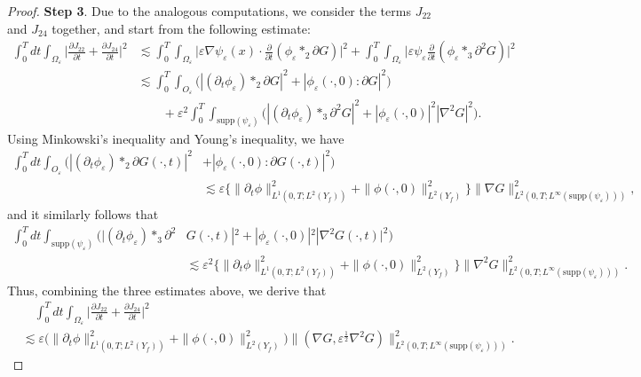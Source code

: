 \documentclass[13pt,CJK]{article}
\theoremstyle{plain}                       %
\theoremstyle{remark}
\numberwithin{equation}{section}
\begin{document}
\begin{proof}
\textbf{Step 3}.
Due to the analogous computations, we consider the terms $J_{22}$ and $J_{24}$ together, and start from
the following estimate:
\begin{equation*}
  \begin{aligned}
  \int_{0}^{T}dt\int_{\Omega_{\varepsilon}}
  \bigg|\frac{\partial J_{22}}{\partial t}+\frac{\partial J_{24}}{\partial t}\bigg|^2
  &\lesssim
  \int_{0}^{T}\int_{\Omega_{\varepsilon}}
  \bigg|\varepsilon\nabla\psi_{\varepsilon}(x)\cdot
  \frac{\partial}{\partial t}(\phi_{\varepsilon}\ast_2\partial G)\bigg|^2 +
  \int_{0}^{T}\int_{\Omega_{\varepsilon}}
 \bigg|\varepsilon\psi_{\varepsilon}\frac{\partial}
  {\partial t}(\phi_{\varepsilon}\ast_3\partial^2 G)\bigg|^2 \\
  &\lesssim
  \int_{0}^{T}\int_{O_{\varepsilon}}
  \big(|(\partial_t\phi_{\varepsilon})\ast_2\partial G|^2
  +|\phi_{\varepsilon}(\cdot,0):\partial G|^2\big) \\
  &\qquad+\varepsilon^2
  \int_{0}^{T}\int_{\text{supp}(\psi_{\varepsilon})}
  \Big(|(\partial_t\phi_{\varepsilon})\ast_3\partial^2G|^2
  +|\phi_{\varepsilon}(\cdot,0)|^2|\nabla^2G|^2\Big).
  \end{aligned}
\end{equation*}
Using Minkowski's inequality and Young's inequality, we have
\begin{equation*}
\begin{aligned}
\int_{0}^{T}dt\int_{O_{\varepsilon}}
  \Big(|(\partial_t\phi_{\varepsilon})\ast_2\partial G(\cdot,t)|^2
&  +|\phi_{\varepsilon}(\cdot,0):\partial G(\cdot,t)|^2\Big)\\
&\lesssim
\varepsilon\Big\{\|\partial_t\phi\|^2_{
L^1(0,T;L^2(Y_f))}
+\|\phi(\cdot,0)\|^2_{L^2(Y_f)}\Big\}
\|\nabla G\|^2_{L^2(0,T;L^{\infty}
(\text{supp}(\psi_{\varepsilon})))},
\end{aligned}
\end{equation*}
and it similarly follows that
\begin{equation*}
\begin{aligned}
\int_{0}^{T}dt\int_{\text{supp}(\psi_{\varepsilon})}
  \Big(|(\partial_t\phi_{\varepsilon})\ast_3\partial^2
  &G(\cdot,t)|^2
  +|\phi_{\varepsilon}(\cdot,0)|^2|\nabla^2G(\cdot,t)|^2\Big)\\
&\lesssim
\varepsilon^2
\Big\{\|\partial_t\phi\|^2_{L^1(0,T;L^2(Y_f))}
+\|\phi(\cdot,0)
\|^2_{L^2(Y_f)}\Big\}
\|\nabla^2G\|^2_{L^2(0,T;L^{\infty}
(\text{supp}(\psi_{\varepsilon})))}.
\end{aligned}
\end{equation*}
Thus, combining the three estimates above, we derive that
\begin{equation}\label{*xi1}
\begin{aligned}
&\quad\int_{0}^{T}dt\int_{\Omega_{\varepsilon}}\Big|\frac{\partial J_{22}}{\partial t}
+\frac{\partial J_{24}}{\partial t}\Big|^2 \\
&\lesssim
\varepsilon\Big(\|\partial_t\phi\|^2_{L^1(0,T;L^2(Y_f))}
+\|\phi(\cdot,0)\|^2_{L^2(Y_f)}\Big)
\|(\nabla G,\varepsilon^{\frac{1}{2}}\nabla^2G)\|^2_{L^2(0,T;L^{\infty}
(\text{supp}(\psi_{\varepsilon})))}.
  \end{aligned}
\end{equation}



\end{proof}
\end{document}
